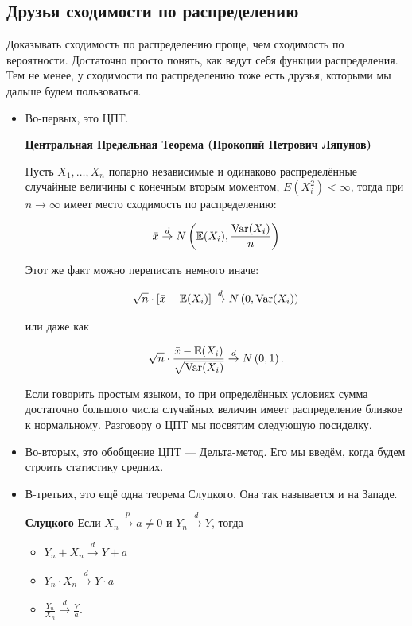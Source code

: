 \documentclass[12pt, a4paper, oneside]{article}
\begin{document}
\subsection{Друзья сходимости по распределению}

Доказывать сходимость по распределению проще, чем сходимость по вероятности. Достаточно просто понять, как ведут себя функции распределения. Тем не менее, у сходимости по распределению тоже есть друзья, которыми мы дальше будем пользоваться.

\begin{itemize} 
\item Во-первых, это ЦПТ. 

\begin{theorem}{\textbf{Центральная Предельная Теорема (Прокопий Петрович Ляпунов)}}

Пусть $X_1, \ldots, X_n$ попарно независимые и одинаково распределённые случайные величины с конечным вторым моментом, $E(X_i^2) < \infty$, тогда при $n \to \infty$ имеет место сходимость по распределению: 

$$
\bar{x} \overset{d}{\to} N \left(\mathbb{E}(X_i), \frac{\operatorname{Var}(X_i)}{n} \right)
$$

Этот же факт можно переписать немного иначе:

\[\sqrt{n} \cdot [\bar{x} - \mathbb{E}(X_i)]  \overset{d}{\to} N \left(0, \operatorname{Var}(X_i)\right)\]

или даже как

\[\sqrt{n} \cdot \frac{\bar{x} - \mathbb{E}(X_i)}{\sqrt{\operatorname{Var}(X_i)}}  \overset{d}{\to} N \left(0, 1\right).\]

\end{theorem}

Если говорить простым языком, то при определённых условиях сумма достаточно большого числа случайных величин имеет распределение близкое к нормальному.  Разговору о ЦПТ мы посвятим следующую посиделку. 

\item Во-вторых, это обобщение ЦПТ --- Дельта-метод. Его мы введём, когда будем строить статистику средних. 

\item В-третьих, это ещё одна теорема Слуцкого. Она так называется и на Западе. 

\begin{theorem}{\textbf{Слуцкого}}
Если $X_n \overset{p}{\to} a \ne 0$ и $Y_n \overset{d}{\to} Y$, тогда 
\begin{itemize} 
\item $Y_n + X_n \overset{d}{\to} Y + a$
\item $Y_n \cdot X_n \overset{d}{\to} Y \cdot a$
\item $\frac{Y_n}{X_n} \overset{d}{\to} \frac{Y}{a}.$
\end{itemize}
\end{theorem}

\end{itemize} 
\end{document}
